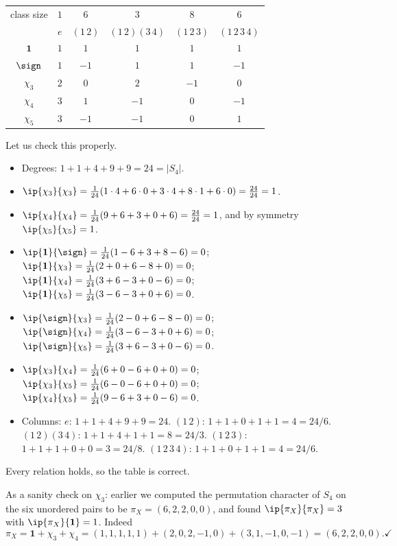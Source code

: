 \begin{center}
\renewcommand{\arraystretch}{1.3}
\setlength{\tabcolsep}{10pt}
\begin{tabular}{c|ccccc}
\toprule
class size & $1$ & $6$ & $3$ & $8$ & $6$\\
 & $e$ & $(1\,2)$ & $(1\,2)(3\,4)$ & $(1\,2\,3)$ & $(1\,2\,3\,4)$\\
\midrule
$\mathbf 1$ & $1$ & $1$ & $1$ & $1$ & $1$\\
$\sign$ & $1$ & $-1$ & $1$ & $1$ & $-1$\\
$\chi_3$ & $2$ & $0$ & $2$ & $-1$ & $0$\\
$\chi_4$ & $3$ & $1$ & $-1$ & $0$ & $-1$\\
$\chi_5$ & $3$ & $-1$ & $-1$ & $0$ & $1$\\
\bottomrule
\end{tabular}
\end{center}

Let us check this properly.
\begin{itemize}
	\item Degrees: $1+1+4+9+9 = 24 = |S_4|$.
	\item $\ip{\chi_3}{\chi_3} = \frac1{24}(1\cdot4 + 6\cdot 0 + 3\cdot 4 + 8\cdot 1 + 6\cdot 0) = \frac{24}{24}=1$.
	\item $\ip{\chi_4}{\chi_4} = \frac1{24}(9 + 6 + 3 + 0 + 6) = \frac{24}{24}=1$, and by symmetry $\ip{\chi_5}{\chi_5} = 1$.
	\item $\ip{\mathbf1}{\sign} = \frac1{24}(1 - 6 + 3 + 8 - 6) = 0$; \; $\ip{\mathbf1}{\chi_3} = \frac1{24}(2 + 0 + 6 - 8 + 0) = 0$; \; $\ip{\mathbf1}{\chi_4} = \frac1{24}(3 + 6 - 3 + 0 - 6) = 0$; \; $\ip{\mathbf1}{\chi_5} = \frac1{24}(3-6-3+0+6) = 0$.
	\item $\ip{\sign}{\chi_3} = \frac1{24}(2 - 0 + 6 - 8 - 0) = 0$; \; $\ip{\sign}{\chi_4} = \frac1{24}(3 - 6 - 3 + 0 + 6) = 0$; \; $\ip{\sign}{\chi_5} = \frac1{24}(3 + 6 - 3 + 0 - 6) = 0$.
	\item $\ip{\chi_3}{\chi_4} = \frac1{24}(6 + 0 - 6 + 0 + 0) = 0$; \; $\ip{\chi_3}{\chi_5} = \frac1{24}(6 - 0 - 6 + 0 + 0) = 0$; \; $\ip{\chi_4}{\chi_5} = \frac1{24}(9 - 6 + 3 + 0 - 6) = 0$.
	\item Columns: $e$: $1+1+4+9+9 = 24$. \;$(1\,2)$: $1+1+0+1+1 = 4 = 24/6$. \;$(1\,2)(3\,4)$: $1+1+4+1+1 = 8 = 24/3$. \;$(1\,2\,3)$: $1+1+1+0+0 = 3 = 24/8$. \;$(1\,2\,3\,4)$: $1+1+0+1+1 = 4 = 24/6$.
\end{itemize}
Every relation holds, so the table is correct.

\begin{remark}
	As a sanity check on $\chi_3$: earlier we computed the permutation character of $S_4$ on the six unordered pairs to be $\pi_X = (6,2,2,0,0)$, and found $\ip{\pi_X}{\pi_X}=3$ with $\ip{\pi_X}{\mathbf 1}=1$. Indeed
	$$\pi_X = \mathbf 1 + \chi_3 + \chi_4 = (1,1,1,1,1)+(2,0,2,-1,0)+(3,1,-1,0,-1) = (6,2,2,0,0). \checkmark$$
\end{remark}

